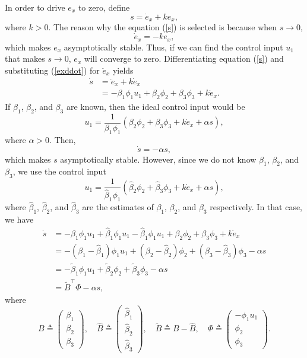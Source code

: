 In order to drive $e_x$ to zero, define
\begin{equation}
s=\dot{e}_x+ke_x,
\label{s}
\end{equation} where $k>0$. The reason why the equation (\ref{s}) is selected is because when $s\rightarrow0$, 
\begin{equation}
\dot{e}_x=-ke_x,
\end{equation} which makes $e_x$ asymptotically stable. Thus, if we can find the control input $u_1$ that makes $s\rightarrow0$, $e_x$ will converge to zero. Differentiating equation (\ref{s}) and substituting (\ref{exddot}) for $\ddot{e}_x$ yields
\begin{align}
\dot{s}&=\ddot{e}_x+k\dot{e}_x
\\&=-\beta_1\phi_1u_1+\beta_2\phi_2+\beta_3\phi_3+k\dot{e}_x.
\label{sdot}
\end{align}
If $\beta_1$, $\beta_2$, and $\beta_3$ are known, then the ideal control input would be 
\begin{equation}
u_1=\frac{1}{\beta_1\phi_1}(\beta_2\phi_2+\beta_3\phi_3+k\dot{e}_x+\alpha s),
\end{equation}
where $\alpha>0$.
Then, 
\begin{equation}
\dot{s}=-\alpha s,
\end{equation} 
which makes $s$ asymptotically stable. 
However, since we do not know $\beta_1$, $\beta_2$, and $\beta_3$, we use the control input
\begin{equation}
u_1=\frac{1}{\hat{\beta}_1\phi_1}(\hat{\beta}_2\phi_2+\hat{\beta}_3\phi_3+k\dot{e}_x+\alpha s),
\label{actualcontrol}
\end{equation}
where $\hat{\beta}_1$, $\hat{\beta}_2$, and $\hat{\beta}_3$ are the estimates of $\beta_1$, $\beta_2$, and $\beta_3$ respectively. 
In that case, we have
\begin{align}
\dot{s}&=-\beta_1\phi_1u_1+\hat{\beta}_1\phi_1u_1-\hat{\beta}_1\phi_1u_1+\beta_2\phi_2+\beta_3\phi_3+k\dot{e}_x
\label{sdot1}
\\&=-(\beta_1-\hat{\beta}_1)\phi_1u_1+(\beta_2-\hat{\beta}_2)\phi_2+(\beta_3-\hat{\beta}_3)\phi_3-\alpha s
\\&=-\tilde{\beta}_1\phi_1u_1+\tilde{\beta}_2\phi_2+\tilde{\beta}_3\phi_3-\alpha s
\\&=\tilde{B}^\top\Phi-\alpha s,
\label{sdot2}
\end{align}
where 
\begin{equation}
B\triangleq\begin{pmatrix}
\beta_1 \\ \beta_2 \\ \beta_3
\end{pmatrix}, \quad
\hat{B}\triangleq\begin{pmatrix} \hat{\beta}_1 \\ \hat{\beta}_2 \\ \hat{\beta}_3 \end{pmatrix}, \quad
\tilde{B}\triangleq B-\hat{B}, \quad 
\Phi \triangleq \begin{pmatrix} -\phi_1u_1 \\ \phi_2 \\ \phi_3 \end{pmatrix}.
\end{equation}
